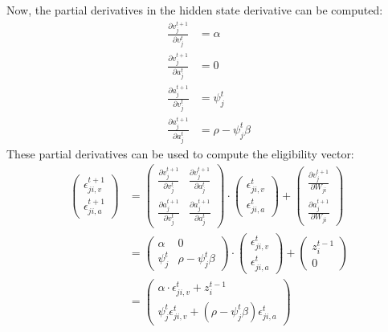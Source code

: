         Now, the partial derivatives in the hidden state derivative can be computed:
        \begin{align}
        \frac{\partial v_j^{t+1}}{\partial v_j^t} &= \alpha\\
        \frac{\partial v_j^{t+1}}{\partial a_j^t} &= 0\\
        \frac{\partial a_j^{t+1}}{\partial v_j^t} &= \psi^t_j\\
        \frac{\partial a_j^{t+1}}{\partial a_j^t} &= \rho - \psi^t_j\beta
        \end{align}
        These partial derivatives can be used to compute the eligibility vector:
        \begin{align}
        \begin{pmatrix}
        \epsilon_{ji, v}^{t+1}\\
        \epsilon_{ji, a}^{t+1}
        \end{pmatrix}
        &=
        \begin{pmatrix}
        \frac{\partial v^{t+1}_j}{\partial v^t_j} & \frac{\partial v^{t+1}_j}{\partial a^t_j}\\
        \frac{\partial a^{t+1}_j}{\partial v^t_j} & \frac{\partial a^{t+1}_j}{\partial a^t_j}
        \end{pmatrix}
        \cdot
        \begin{pmatrix}
        \epsilon_{ji, v}^t\\
        \epsilon_{ji, a}^t
        \end{pmatrix}
        +
        \begin{pmatrix}
        \frac{\partial v^{t+1}_j}{\partial W_{ji}}\\
        \frac{\partial a^{t+1}_j}{\partial W_{ji}}
        \end{pmatrix}\\
        &=
        \begin{pmatrix}
        \alpha & 0\\
        \psi^t_j & \rho-\psi^t_j\beta
        \end{pmatrix}
        \cdot
        \begin{pmatrix}
        \epsilon_{ji, v}^t\\
        \epsilon_{ji, a}^t
        \end{pmatrix}
        +
        \begin{pmatrix}
        z_i^{t-1}\\
        0
        \end{pmatrix}\label{eq:evector_b}\\
        &=
        \begin{pmatrix}
        \alpha \cdot\epsilon_{ji, v}^t + z_i^{t-1}\\
        \psi^t_j\epsilon^t_{ji, v} + \left(\rho-\psi^t_j\beta\right)\epsilon^t_{ji, a}
        \end{pmatrix}
        \end{align}

